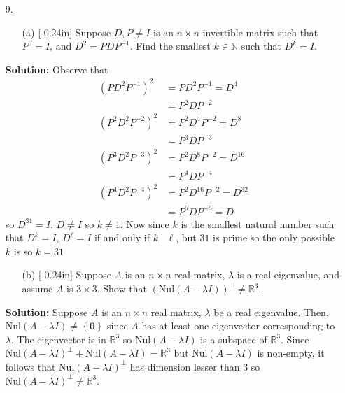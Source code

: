 \documentclass[letterpaper,12pt]{article}
\newcommand{\set}[1]{\left\{ #1 \right\}}
\theoremstyle{definition}
\begin{document}
\newpage
\begin{enumerate}
    \item[9.] \begin{enumerate}
        \item[(a)]\reversemarginpar{}[-0.24in] Suppose $D,P\neq I$ is an $n\times n$ invertible  matrix such that $P^5 = I$, and $D^2 = PDP^{-1}$. Find the smallest $k \in \mathbb{N}$ such that $D^k = I$.
    \end{enumerate}
    \begin{mdframed}
    \textbf{Solution:}
        Observe that \begin{align*}
          (P D^2P^{-1})^2 &= P D^2P^{-1} =D^4 \\
            &= P^2DP^{-2} \\
         (P^2 D^2P^{-2})^2 &= P^2 D^4P^{-2} =D^8 \\
            &= P^3DP^{-3} \\
            (P^3 D^2P^{-3})^2  &= P^2D^8P^{-2} = D^{16} \\
            &= P^4DP^{-4} \\
             (P^4 D^2P^{-4})^2  &= P^2D^{16}P^{-2} = D^{32} \\
            &= P^5DP^{-5} = D 
        \end{align*} so $D^{31} = I$. $D \neq I$ so $k \neq 1$. Now since $k$ is the smallest natural number such that $D^k=I$, $D^{\ell} = I$ if and only if $k \mid \ell$, but $31$ is prime so the only possible $k$ is so $k=31$
    \end{mdframed}
\end{enumerate}
\newpage
\begin{enumerate}
    \item[] \begin{enumerate}
        \item[(b)]\reversemarginpar{}[-0.24in] Suppose $A$ is an $n\times n$ real matrix, $\lambda$ is a real eigenvalue, and assume $A$ is $3\times 3$. Show that $(\mathrm{Nul}(A-\lambda I))^\perp \neq \mathbb{R}^3$.
    \end{enumerate}
    \begin{mdframed}
        \textbf{Solution:} Suppose $A$ is an $n\times n$ real matrix, $\lambda$ be a real eigenvalue. Then, $\mathrm{Nul}(A - \lambda I)\neq \set{\mathbf{0}}$ since $A$ has at least one eigenvector corresponding to $\lambda$. The eigenvector is in $\mathbb{R}^3$ so $\mathrm{Nul}(A - \lambda I)$ is a subspace of $\mathbb{R}^3$. Since $\mathrm{Nul}(A - \lambda I)^\perp + \mathrm{Nul}(A - \lambda I) = \mathbb{R}^3$ but $\mathrm{Nul}(A - \lambda I)$ is non-empty, it follows that $\mathrm{Nul}(A - \lambda I)^\perp$ has dimension lesser than 3 so $\mathrm{Nul}(A - \lambda I)^\perp \neq \mathbb{R}^3$.
    \end{mdframed}
\end{enumerate}
\end{document}
